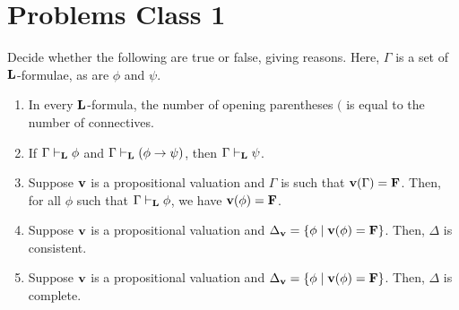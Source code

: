 \section*{Problems Class 1}
\setcounter{PC}{1}

\begin{boxproblem}
    Decide whether the following are true or false, giving reasons. Here, $\Gamma$ is a set of $\mathbf{L}$-formulae, as are $\phi$ and $\psi$.
    \begin{enumerate}[label = \normalfont \arabic*.]
        \item In every $\mathbf{L}$-formula, the number of opening parentheses $($ is equal to the number of connectives.
        
        \item If $\Gamma \vdash_{\mathbf{L}} \phi$ and $\Gamma \vdash_{\mathbf{L}} \left( \phi \to \psi \right)$, then $\Gamma \vdash_{\mathbf{L}} \psi$.
        
        \item Suppose $\mathbf{v}$ is a propositional valuation and $\Gamma$ is such that $\mathbf{v}\!\left( \Gamma \right) = \mathbf{F}$. Then, for all $\phi$ such that $\Gamma \vdash_{\mathbf{L}} \phi$, we have $\mathbf{v}\!\left( \phi \right) = \mathbf{F}$.
        
        \item Suppose $\mathbf{v}$ is a propositional valuation and $\Delta_{\mathbf{v}} = \left\{ \phi \; \middle\vert \; \mathbf{v}\!\left( \phi \right) = \mathbf{F} \right\}$. Then, $\Delta$ is consistent.
        
        \item Suppose $\mathbf{v}$ is a propositional valuation and $\Delta_{\mathbf{v}} = \left\{ \phi \; \middle\vert \; \mathbf{v}\!\left( \phi \right) = \mathbf{F} \right\}$. Then, $\Delta$ is complete.
    \end{enumerate}
\end{boxproblem}
